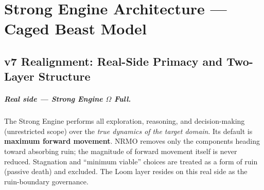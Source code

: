 
\chapter{Strong Engine Architecture --- Caged Beast Model}
\label{ch:strong-engine}


\section{v7 Realignment: Real-Side Primacy and Two-Layer Structure}
\label{sec:strong-engine-v7-realignment}


\paragraph{Real side --- Strong Engine $\Omega$ Full.}
The Strong Engine performs all exploration, reasoning, and decision-making
(unrestricted scope) over the \emph{true dynamics of the target domain}.
Its default is \textbf{maximum forward movement}. NRMO removes only the
components heading toward absorbing ruin; the magnitude of forward movement
itself is never reduced. Stagnation and ``minimum viable'' choices are
treated as a form of ruin (passive death) and excluded. The Loom layer
resides on this real side as the ruin-boundary governance.

